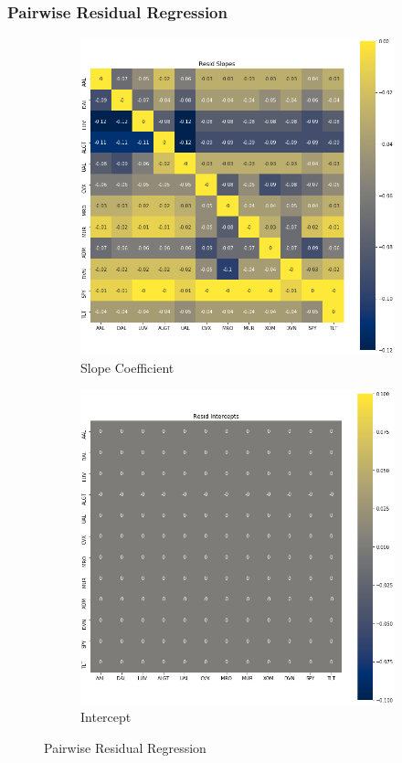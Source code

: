 \documentclass{article}
\begin{document}
\subsubsection{Pairwise Residual Regression}
\begin{figure}[h!]
  \centering
  \begin{subfigure}{.5\textwidth}
    \centering
    \includegraphics[width=.95\linewidth]{../Figures/pair_resid_reg_slope.png}
    \caption{Slope Coefficient}
  \end{subfigure}%
  \begin{subfigure}{.5\textwidth}
    \centering
    \includegraphics[width=.95\linewidth]{../Figures/pair_resid_reg_intercept.png}
    \caption{Intercept}
  \end{subfigure}
  \caption{Pairwise Residual Regression}
\end{figure}
\end{document}
